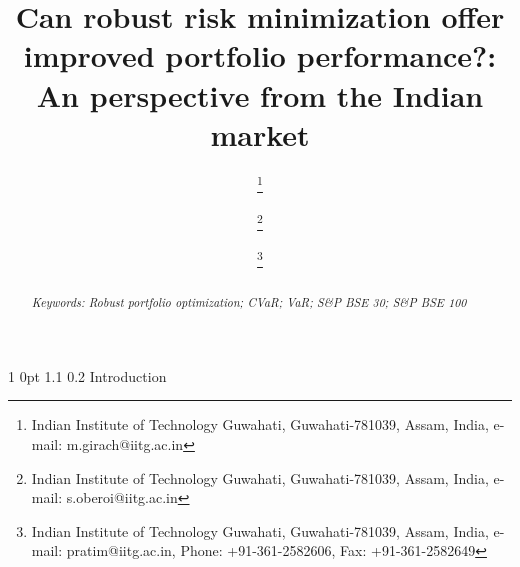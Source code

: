\documentclass[12pt]{article}
\makeatletter
\numberwithin{equation}{section}
\renewcommand{\section}{
  \@startsection
  {section}%
  {1}%
  {0pt}%
  {1.1\baselineskip}%
  {0.2\baselineskip}%
  {\sc \centering}%
}
\makeatother
\begin{document}
\title{\large\sc Can robust risk minimization offer improved portfolio performance?: An perspective from the Indian market}
\normalsize

\author{ \thanks{Indian Institute of Technology Guwahati, Guwahati-781039, Assam, India, e-mail: m.girach@iitg.ac.in}
\and {} \thanks{Indian Institute of Technology Guwahati, Guwahati-781039, Assam, India, e-mail: s.oberoi@iitg.ac.in}
\and {} \thanks{Indian Institute of Technology Guwahati, Guwahati-781039, Assam, India, e-mail: pratim@iitg.ac.in,
Phone: +91-361-2582606, Fax: +91-361-2582649}}
\date{}
\maketitle
\begin{abstract}

{\it Keywords: Robust portfolio optimization; CVaR; VaR; S\&P BSE 30; S\&P BSE 100}

\end{abstract}

\section{Introduction}
\label{Introduction}
\end{document}
